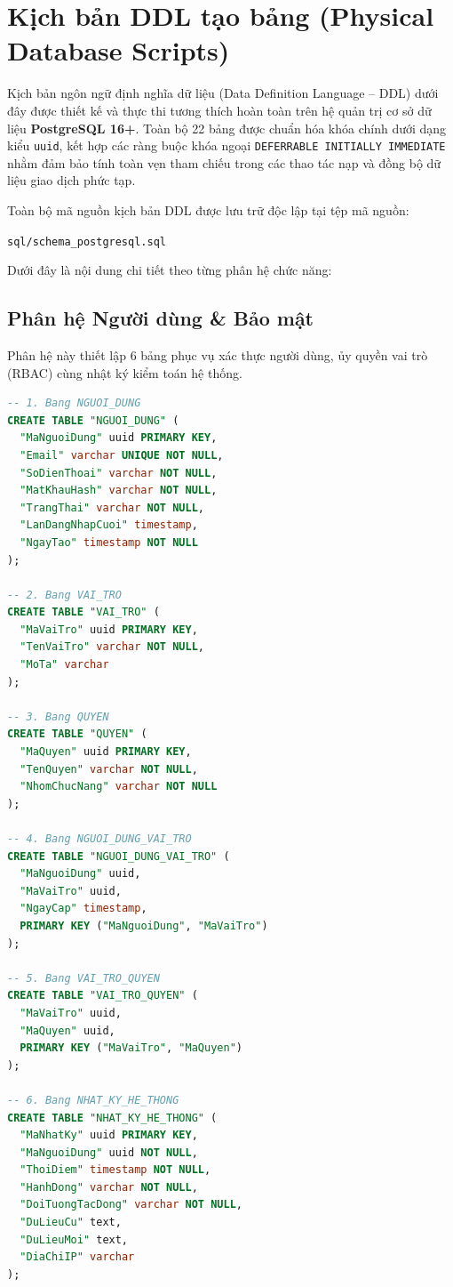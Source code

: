 \section{Kịch bản DDL tạo bảng (Physical Database Scripts)}
\label{sec:3_5_ddl_scripts}

Kịch bản ngôn ngữ định nghĩa dữ liệu (Data Definition Language -- DDL) dưới đây được thiết kế và thực thi tương thích hoàn toàn trên hệ quản trị cơ sở dữ liệu \textbf{PostgreSQL 16+}. Toàn bộ 22 bảng được chuẩn hóa khóa chính dưới dạng kiểu \texttt{uuid}, kết hợp các ràng buộc khóa ngoại \texttt{DEFERRABLE INITIALLY IMMEDIATE} nhằm đảm bảo tính toàn vẹn tham chiếu trong các thao tác nạp và đồng bộ dữ liệu giao dịch phức tạp.

Toàn bộ mã nguồn kịch bản DDL được lưu trữ độc lập tại tệp mã nguồn:
\begin{center}
    \texttt{sql/schema\_postgresql.sql}
\end{center}
Dưới đây là nội dung chi tiết theo từng phân hệ chức năng:

\subsection{Phân hệ Người dùng \& Bảo mật}

Phân hệ này thiết lập 6 bảng phục vụ xác thực người dùng, ủy quyền vai trò (RBAC) cùng nhật ký kiểm toán hệ thống.

\begin{lstlisting}[language=SQL, caption={Kịch bản DDL - Phân hệ Người dùng và Bảo mật}, label={lst:ddl_user_security}]
-- 1. Bang NGUOI_DUNG
CREATE TABLE "NGUOI_DUNG" (
  "MaNguoiDung" uuid PRIMARY KEY,
  "Email" varchar UNIQUE NOT NULL,
  "SoDienThoai" varchar NOT NULL,
  "MatKhauHash" varchar NOT NULL,
  "TrangThai" varchar NOT NULL,
  "LanDangNhapCuoi" timestamp,
  "NgayTao" timestamp NOT NULL
);

-- 2. Bang VAI_TRO
CREATE TABLE "VAI_TRO" (
  "MaVaiTro" uuid PRIMARY KEY,
  "TenVaiTro" varchar NOT NULL,
  "MoTa" varchar
);

-- 3. Bang QUYEN
CREATE TABLE "QUYEN" (
  "MaQuyen" uuid PRIMARY KEY,
  "TenQuyen" varchar NOT NULL,
  "NhomChucNang" varchar NOT NULL
);

-- 4. Bang NGUOI_DUNG_VAI_TRO
CREATE TABLE "NGUOI_DUNG_VAI_TRO" (
  "MaNguoiDung" uuid,
  "MaVaiTro" uuid,
  "NgayCap" timestamp,
  PRIMARY KEY ("MaNguoiDung", "MaVaiTro")
);

-- 5. Bang VAI_TRO_QUYEN
CREATE TABLE "VAI_TRO_QUYEN" (
  "MaVaiTro" uuid,
  "MaQuyen" uuid,
  PRIMARY KEY ("MaVaiTro", "MaQuyen")
);

-- 6. Bang NHAT_KY_HE_THONG
CREATE TABLE "NHAT_KY_HE_THONG" (
  "MaNhatKy" uuid PRIMARY KEY,
  "MaNguoiDung" uuid NOT NULL,
  "ThoiDiem" timestamp NOT NULL,
  "HanhDong" varchar NOT NULL,
  "DoiTuongTacDong" varchar NOT NULL,
  "DuLieuCu" text,
  "DuLieuMoi" text,
  "DiaChiIP" varchar
);
\end{lstlisting}

